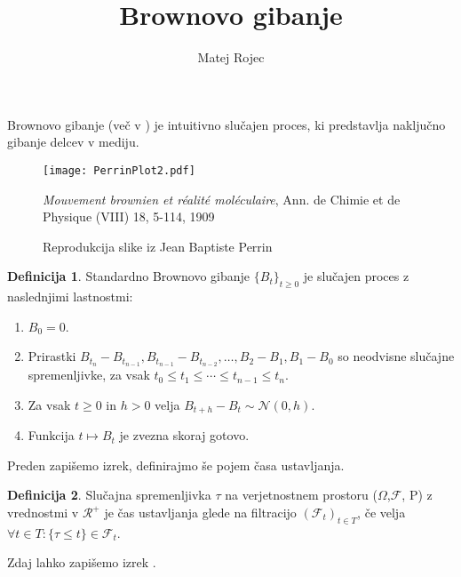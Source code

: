 \documentclass[11pt]{article}
\begin{document}
\title{Brownovo gibanje}
\author{Matej Rojec}
\date{}

\maketitle

\theoremstyle{definition}
\newtheorem{definicija}{Definicija}


\theoremstyle{plain}
\newtheorem{Izrek}{Izrek}


\newcommand{\f}{\mathcal{F}}


Brownovo gibanje (več v \cite{karatzas1991brownian}) je intuitivno slučajen proces, %
ki predstavlja naključno gibanje delcev v mediju.


\begin{figure}[h!]
    \centering
    \texttt{[image: PerrinPlot2.pdf]}
    \caption{Reprodukcija slike iz Jean Baptiste Perrin}
    \emph{Mouvement brownien et réalité moléculaire}, Ann. de Chimie et de Physique (VIII) 18, 5-114, 1909
    
\end{figure}


 
    \begin{definicija}
    Standardno Brownovo gibanje $\{B_t\}_{t \geq 0}$ je slučajen proces z naslednjimi lastnostmi: 
        \begin{enumerate} 
        \item $B_0 = 0$.
       \item  Prirastki $B_{t_n} - B_{t_{n-1}}, B_{t_{n-1}} - B_{t_{n-2}}, \ldots, B_2 - B_1, B_1 - B_0$ so neodvisne slučajne spremenljivke, za vsak $t_0 \leq t_1 \leq \cdots \leq t_{n-1} \leq t_n$.
        \item Za vsak $t \geq 0$ in $h > 0$ velja $B_{t+h} - B_t \sim \mathcal{N}(0, h)$.
        \item Funkcija $t \mapsto B_t$ je zvezna skoraj gotovo.
        \end{enumerate}
    \end{definicija}

 
    Preden zapišemo izrek, definirajmo še pojem časa ustavljanja.
   
    
    \begin{definicija}
    Slučajna spremenljivka $\tau$ na verjetnostnem prostoru ($\Omega$,$\f$, P) z vrednostmi v $\mathcal{R}^+$
    je čas ustavljanja glede na filtracijo $(\f_t)_{t \in T}$, če velja $\forall t \in T : \{\tau \leq t\} \in \mathcal{F}_t$.
    
    
    Zdaj lahko zapišemo izrek \cite{karatzas1991brownian}.
    \end{definicija}
    
\end{document}

